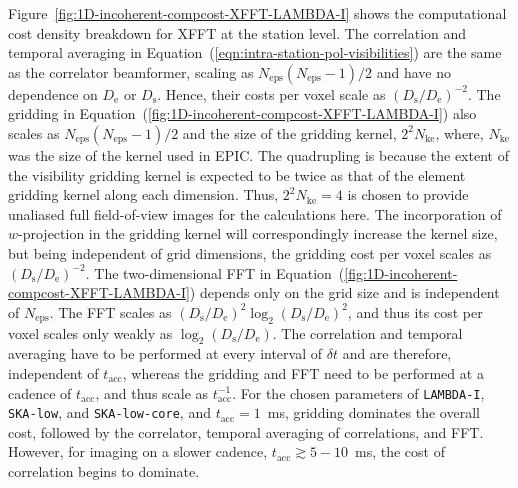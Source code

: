 \documentclass[
  journal=pasa,
  manuscript=article-type,
  year=2020,
  volume=37,
]{cup-journal}
\begin{document}
Figure~\ref{fig:1D-incoherent-compcost-XFFT-LAMBDA-I} shows the computational cost density breakdown for XFFT at the station level. The correlation and temporal averaging in Equation~(\ref{eqn:intra-station-pol-visibilities}) are the same as the correlator beamformer, scaling as $N_\textrm{eps}(N_\textrm{eps}-1)/2$ and have no dependence on $D_\textrm{e}$ or $D_\textrm{s}$. Hence, their costs per voxel scale as $(D_\textrm{s}/D_\textrm{e})^{-2}$. The gridding in Equation~(\ref{fig:1D-incoherent-compcost-XFFT-LAMBDA-I}) also scales as $N_\textrm{eps}(N_\textrm{eps}-1)/2$ and the size of the gridding kernel, $2^2 N_\textrm{ke}$, where, $N_\textrm{ke}$ was the size of the kernel used in EPIC. The quadrupling is because the extent of the visibility gridding kernel is expected to be twice as that of the element gridding kernel along each dimension. Thus, $2^2 N_\textrm{ke}=4$ is chosen to provide unaliased full field-of-view images for the calculations here. The incorporation of $w$-projection in the gridding kernel will correspondingly increase the kernel size, but being independent of grid dimensions, the gridding cost per voxel scales as $(D_\textrm{s}/D_\textrm{e})^{-2}$. The two-dimensional FFT in Equation~(\ref{fig:1D-incoherent-compcost-XFFT-LAMBDA-I}) depends only on the grid size and is independent of $N_\textrm{eps}$. The FFT scales as $(D_\textrm{s}/D_\textrm{e})^2\log_2(D_\textrm{s}/D_\textrm{e})^2$, and thus its cost per voxel scales only weakly as $\log_2(D_\textrm{s}/D_\textrm{e})$. The correlation and temporal averaging have to be performed at every interval of $\delta t$ and are therefore, independent of $t_\textrm{acc}$, whereas the gridding and FFT need to be performed at a cadence of $t_\textrm{acc}$, and thus scale as $t_\textrm{acc}^{-1}$. For the chosen parameters of \texttt{LAMBDA-I}, \texttt{SKA-low}, and \texttt{SKA-low-core}, and $t_\textrm{acc}=1$~ms, gridding dominates the overall cost, followed by the correlator, temporal averaging of correlations, and FFT. However, for imaging on a slower cadence, $t_\textrm{acc}\gtrsim 5-10$~ms, the cost of correlation begins to dominate. 
\end{document}
